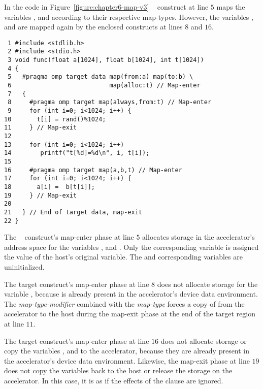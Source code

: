 In the code in
Figure~\ref{figure:chapter6-map-v3} 
~ construct at line $5$ maps the variables ,  and
 according to their respective map-types.  
However, the variables ,  and 
are mapped again by the enclosed  constructs at lines $8$ and $16$.

\begin{figure*}[!tb]
\begin{verbatim}
 1 #include <stdlib.h>
 2 #include <stdio.h>
 3 void func(float a[1024], float b[1024], int t[1024])
 4 {
 5   #pragma omp target data map(from:a) map(to:b) \
 6                           map(alloc:t) // Map-enter
 7   {
 8     #pragma omp target map(always,from:t) // Map-enter
 9     for (int i=0; i<1024; i++) {
10       t[i] = rand()%1024;
11     } // Map-exit
12 
13     for (int i=0; i<1024; i++)
14        printf("t[%d]=%d\n", i, t[i]);
15 
16     #pragma omp target map(a,b,t) // Map-enter
17     for (int i=0; i<1024; i++) {
18       a[i] =  b[t[i]];
19     } // Map-exit
20 
21   } // End of target data, map-exit
22 }
\end{verbatim}
\caption{ \textbf {Example of a variable appearing in nested map clauses} -- \small
          There is only one instance of a variable in an accelerator's
          address space.
         }
\label{figure:chapter6-map-v3}
\end{figure*}

The ~ construct's map-enter phase at line $5$ allocates
storage in the accelerator's address space for the variables ,  and .
Only the corresponding variable  is assigned the value of the host's
original \code{a} variable.  The \code{b} and \code{t} corresponding variables are
uninitialized.

The target construct's map-enter phase at line $8$ does not allocate storage
for the variable , because \code{t} is already present in the accelerator's device
data environment.  The \code{always} \emph{map-type-modifier} combined with the
\code{from} \emph{map-type} forces a copy of \code{t} from the accelerator to the host
during the map-exit phase at the end of the target region at line $11$.

The target construct's map-enter phase at line $16$ does not allocate storage
or copy the variables \code{a}, \code{b} and \code{t} to the accelerator, because they are
already present in the accelerator's device data environment.  Likewise, the
map-exit phase at line $19$ does not copy the variables back to the host or
release the storage on the accelerator.  In this case, it is as if the effects
of the \code{map} clause are ignored.

